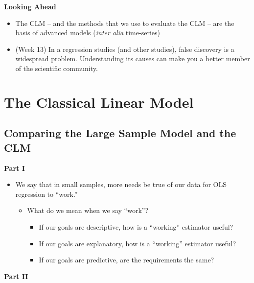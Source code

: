 \documentclass[
]{book}
\providecommand{\tightlist}{%
  \setlength{\itemsep}{0pt}\setlength{\parskip}{0pt}}
\theoremstyle{definition}
\theoremstyle{definition}
\theoremstyle{definition}
\theoremstyle{definition}
\theoremstyle{remark}
\begin{document}
\textbf{Looking Ahead}

\begin{itemize}
\tightlist
\item
  The CLM -- and the methods that we use to evaluate the CLM -- are the basis of advanced models (\emph{inter alia} time-series)
\item
  (Week 13) In a regression studies (and other studies), false discovery is a widespread problem. Understanding its causes can make you a better member of the scientific community.
\end{itemize}

\hypertarget{the-classical-linear-model-1}{%
\section{The Classical Linear Model}\label{the-classical-linear-model-1}}

\hypertarget{comparing-the-large-sample-model-and-the-clm}{%
\subsection{Comparing the Large Sample Model and the CLM}\label{comparing-the-large-sample-model-and-the-clm}}

\textbf{Part I}

\begin{itemize}
\tightlist
\item
  We say that in small samples, more needs be true of our data for OLS regression to ``work.''

  \begin{itemize}
  \tightlist
  \item
    What do we mean when we say ``work''?

    \begin{itemize}
    \tightlist
    \item
      If our goals are descriptive, how is a ``working'' estimator useful?
    \item
      If our goals are explanatory, how is a ``working'' estimator useful?
    \item
      If our goals are predictive, are the requirements the same?
    \end{itemize}
  \end{itemize}
\end{itemize}

\textbf{Part II}
\end{document}

